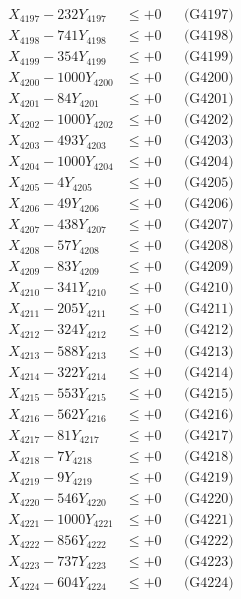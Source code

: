 \documentclass[a4paper,10pt]{article}
\begin{document}
{\begin{align}
X_{4197} - 232Y_{4197} &\leq +0 && \text{(G4197)} \\
X_{4198} - 741Y_{4198} &\leq +0 && \text{(G4198)} \\
X_{4199} - 354Y_{4199} &\leq +0 && \text{(G4199)} \\
X_{4200} - 1000Y_{4200} &\leq +0 && \text{(G4200)} \\
\allowbreak
X_{4201} - 84Y_{4201} &\leq +0 && \text{(G4201)} \\
X_{4202} - 1000Y_{4202} &\leq +0 && \text{(G4202)} \\
X_{4203} - 493Y_{4203} &\leq +0 && \text{(G4203)} \\
X_{4204} - 1000Y_{4204} &\leq +0 && \text{(G4204)} \\
X_{4205} - 4Y_{4205} &\leq +0 && \text{(G4205)} \\
X_{4206} - 49Y_{4206} &\leq +0 && \text{(G4206)} \\
X_{4207} - 438Y_{4207} &\leq +0 && \text{(G4207)} \\
X_{4208} - 57Y_{4208} &\leq +0 && \text{(G4208)} \\
X_{4209} - 83Y_{4209} &\leq +0 && \text{(G4209)} \\
X_{4210} - 341Y_{4210} &\leq +0 && \text{(G4210)} \\
\allowbreak
X_{4211} - 205Y_{4211} &\leq +0 && \text{(G4211)} \\
X_{4212} - 324Y_{4212} &\leq +0 && \text{(G4212)} \\
X_{4213} - 588Y_{4213} &\leq +0 && \text{(G4213)} \\
X_{4214} - 322Y_{4214} &\leq +0 && \text{(G4214)} \\
X_{4215} - 553Y_{4215} &\leq +0 && \text{(G4215)} \\
X_{4216} - 562Y_{4216} &\leq +0 && \text{(G4216)} \\
X_{4217} - 81Y_{4217} &\leq +0 && \text{(G4217)} \\
X_{4218} - 7Y_{4218} &\leq +0 && \text{(G4218)} \\
X_{4219} - 9Y_{4219} &\leq +0 && \text{(G4219)} \\
X_{4220} - 546Y_{4220} &\leq +0 && \text{(G4220)} \\
\allowbreak
X_{4221} - 1000Y_{4221} &\leq +0 && \text{(G4221)} \\
X_{4222} - 856Y_{4222} &\leq +0 && \text{(G4222)} \\
X_{4223} - 737Y_{4223} &\leq +0 && \text{(G4223)} \\
X_{4224} - 604Y_{4224} &\leq +0 && \text{(G4224)} \\

\end{align}}
\end{document}
